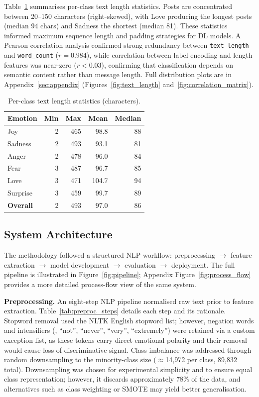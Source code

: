 Table~\ref{tab:eda_summary} summarises per-class text length statistics. Posts are concentrated between 20--150 characters (right-skewed), with Love producing the longest posts (median 94 chars) and Sadness the shortest (median 81). These statistics informed maximum sequence length and padding strategies for DL models. A Pearson correlation analysis confirmed strong redundancy between \texttt{text\_length} and \texttt{word\_count} ($r = 0.984$), while correlation between label encoding and length features was near-zero ($r < 0.03$), confirming that classification depends on semantic content rather than message length. Full distribution plots are in Appendix~\ref{sec:appendix} (Figures~\ref{fig:text_length} and~\ref{fig:correlation_matrix}).

\begin{table}[!htb]
\centering
\caption{Per-class text length statistics (characters).}
\label{tab:eda_summary}
\footnotesize
\setlength{\tabcolsep}{3pt}
\begin{tabular}{@{}lrrrr@{}}
\toprule
\textbf{Emotion} & \textbf{Min} & \textbf{Max} & \textbf{Mean} & \textbf{Median} \\
\midrule
Joy       & 2 & 465 & 98.8 & 88 \\
Sadness   & 2 & 493 & 93.1 & 81 \\
Anger     & 2 & 478 & 96.0 & 84 \\
Fear      & 3 & 487 & 96.7 & 85 \\
Love      & 3 & 471 & 104.7 & 94 \\
Surprise  & 3 & 459 & 99.7 & 89 \\
\midrule
\textbf{Overall} & 2 & 493 & 97.0 & 86 \\
\bottomrule
\end{tabular}
\end{table}

\subsection{System Architecture}

The methodology followed a structured NLP workflow: preprocessing $\rightarrow$ feature extraction $\rightarrow$ model development $\rightarrow$ evaluation $\rightarrow$ deployment. The full pipeline is illustrated in Figure~\ref{fig:pipeline}; Appendix Figure~\ref{fig:process_flow} provides a more detailed process-flow view of the same system.

\textbf{Preprocessing.} An eight-step NLP pipeline normalised raw text prior to feature extraction. Table~\ref{tab:preproc_steps} details each step and its rationale. Stopword removal used the NLTK English stopword list; however, negation words and intensifiers (\eg, ``not'', ``never'', ``very'', ``extremely'') were retained via a custom exception list, as these tokens carry direct emotional polarity and their removal would cause loss of discriminative signal. Class imbalance was addressed through random downsampling to the minority-class size ($\approx$14,972 per class, 89,832 total). Downsampling was chosen for experimental simplicity and to ensure equal class representation; however, it discards approximately 78\% of the data, and alternatives such as class weighting or SMOTE may yield better generalisation.

